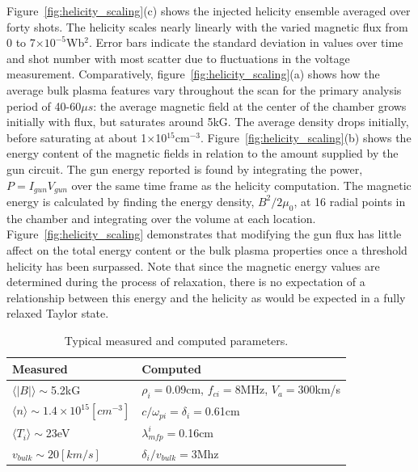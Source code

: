 \documentclass[aps,prl,amsmath,amssymb,reprint,superscriptaddress]{revtex4-1} %
\begin{document}
Figure~\ref{fig:helicity_scaling}(c) shows the injected helicity ensemble averaged over forty shots. The helicity scales nearly linearly with the varied magnetic flux from 0 to 7$\times 10^{-5}$Wb$^2$. Error bars indicate the standard deviation in values over time and shot number with most scatter due to fluctuations in the voltage measurement. Comparatively, figure~\ref{fig:helicity_scaling}(a) shows how the average bulk plasma features vary throughout the scan for the primary analysis period of 40-60$\mu s$: the average magnetic field at the center of the chamber grows initially with flux, but saturates around 5kG. The average density drops initially, before saturating at about 1$\times$10$^{15}$cm$^{-3}$. Figure~\ref{fig:helicity_scaling}(b) shows the energy content of the magnetic fields in relation to the amount supplied by the gun circuit. The gun energy reported is found by integrating the power, $P = I_{gun}V_{gun}$ over the same time frame as the helicity computation. The magnetic energy is calculated by finding the energy density, $B^{2}/2\mu_{0}$, at 16 radial points in the chamber and integrating over the volume at each location. Figure~\ref{fig:helicity_scaling} demonstrates that modifying the gun flux has little affect on the total energy content or the bulk plasma properties once a threshold helicity has been surpassed. Note that since the magnetic energy values are determined during the process of relaxation, there is no expectation of a relationship between this energy and the helicity as would be expected in a fully relaxed Taylor state.



\begin{table}
\caption{\label{tab:params}Typical measured and computed parameters.}
\begin{tabular}{|l|l|}
\hline
Measured&Computed\\
\hline
$\langle |B|\rangle \sim $5.2kG&$\rho_{i} = $0.09cm, $f_{ci} = $8MHz, $V_{a} = $300km/s\\
$\langle n\rangle \sim 1.4\times 10^{15} [cm^{-3}]$&$c/\omega_{pi} = \delta_{i} = $0.61cm\\
$\langle T_{i}\rangle \sim $23eV&$\lambda_{mfp}^{i} = $0.16cm\\
$v_{bulk} \sim 20[km/s]$&$\delta_{i}/v_{bulk} = $3Mhz \\
\hline
\end{tabular}
\end{table}
\end{document}
